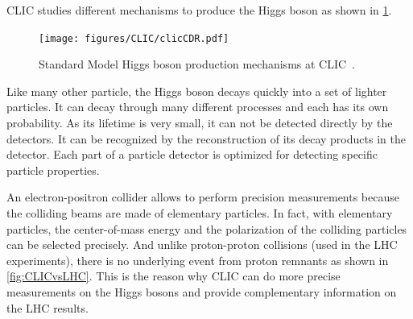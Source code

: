 CLIC studies different mechanisms to produce the Higgs boson as shown
in \cref{fig:HiggsProductionMechanisms}.

\begin{figure}[htbp]
  \centering
  \texttt{[image: figures/CLIC/clicCDR.pdf]}
  \caption{Standard Model Higgs boson production mechanisms at
    CLIC~\cite{Linssen:1425915}.}
  \label{fig:HiggsProductionMechanisms}
\end{figure}



Like many other particle, the Higgs boson decays quickly into a set of
lighter particles. It can decay through many different processes and
each has its own probability. As its lifetime is very small, it can
not be detected directly by the detectors. It can be recognized by the
reconstruction of its decay products in the detector. Each part of a
particle detector is optimized for detecting specific particle
properties.

An electron-positron collider allows to perform precision measurements
because the colliding beams are made of elementary particles. In fact,
with elementary particles, the center-of-mass energy and the
polarization of the colliding particles can be selected precisely. And
unlike proton-proton collisions (used in the LHC experiments), there
is no underlying event from proton remnants as shown in
\cref{fig:CLICvsLHC}. This is the reason why CLIC can do more precise
measurements on the Higgs bosons and provide complementary information
on the LHC results.

